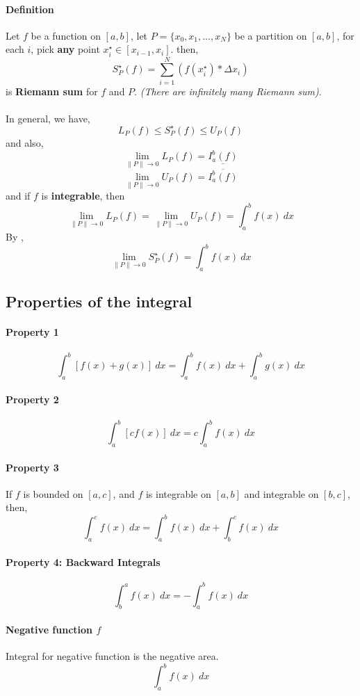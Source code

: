 \documentclass{article}
\begin{document}
	\paragraph{Definition} Let $f$ be a  function on $[a,b]$, let $P = \{x_0, x_1, \dots, x_N \}$ be a partition on $[a,b]$, for each $i$, pick \textbf{any} point $x_i^\star \in [x_{i-1}, x_i]$. then, 
	\[
	S_P^\star (f) = \sum_{i=1}^{N}(f(x_i^\star) * \Delta x_i)
	\]
	is  \textbf{Riemann sum} for $f$ and $P$. \emph{(There are infinitely many Riemann sum)}.
	\paragraph{}In general, we have,
	\[
	L_P (f) \leq S_P^\star (f) \leq U_P (f)
	\] and also,
	\[
	\lim_{\lVert P \rVert \to 0} L_P (f) = \underline{I_a^b(f)}
	\]
	\[
	\lim_{\lVert P \rVert \to 0} U_P (f) = \overline{I_a^b(f)}
	\]
	and if $f$ is \textbf{integrable}, then
	\[
	\lim_{\lVert P \rVert \to 0} L_P(f) = \lim_{\lVert P \rVert \to 0} U_P(f) = \int_a^b f(x)\ dx
	\] By ,
	\[
	\lim_{\lVert P \rVert \to 0} S_P^\star (f) = \int_a^b f(x)\ dx
	\]
	\subsection{Properties of the integral}
	\paragraph{Property 1}
	\[
	\int_a^b [f(x) + g(x)]\ dx = \int_a^b f(x)\ dx + \int_a^b g(x)\ dx
	\]
	\paragraph{Property 2}
	\[
	\int_a^b[c f(x)]\ dx = c \int_a^b f(x)\ dx
	\]
	\paragraph{Property 3} If $f$ is bounded on $[a,c]$, and $f$ is integrable on $[a,b]$ and integrable on $[b,c]$, then,
	\[
	\int_a^c f(x)\ dx = \int_a^b f(x)\ dx + \int_b^c f(x)\ dx
	\]
	\paragraph{Property 4: Backward Integrals}
	\[
	\int_b^a f(x)\ dx = - \int_a^b f(x)\ dx
	\]
	\paragraph{Negative function $f$} Integral for negative function is the negative area.
	\[
	\int_a^b f(x)\ dx
	\]
	
\end{document}
